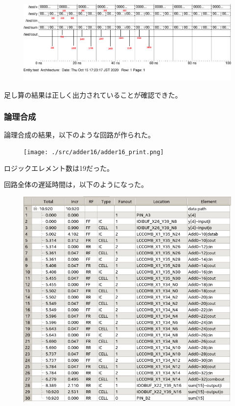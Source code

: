 \begin{figure}[H]
  \centering
  \includegraphics[width=\linewidth]{./src/adder16/adder16_wave21.png}
\end{figure}

足し算の結果は正しく出力されていることが確認できた。

\subsubsection{論理合成}
論理合成の結果，以下のような回路が作られた。

\begin{figure}[H]
  \centering
  \texttt{[image: ./src/adder16/adder16\_print.png]}
\end{figure}

ロジックエレメント数は19だった。

回路全体の遅延時間は，以下のようになった。

\begin{figure}[H]
  \centering
  \includegraphics[width=\linewidth]{./src/adder16/adder16Timing.png}
\end{figure}

